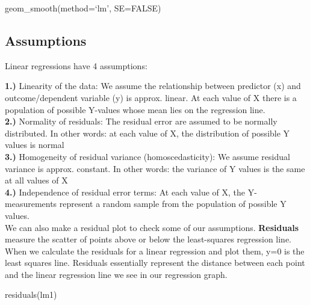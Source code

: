 \documentclass[
  letterpaper,
  DIV=11,
  numbers=noendperiod]{scrartcl}
\newenvironment{Shaded}{\begin{snugshade}}{\end{snugshade}}
\newcommand{\FunctionTok}[1]{\textcolor[rgb]{0.28,0.35,0.67}{#1}}
\newcommand{\NormalTok}[1]{\textcolor[rgb]{0.00,0.23,0.31}{#1}}
\begin{document}
geom\_smooth(method=`lm', SE=FALSE)

\subsection{\texorpdfstring{\textbf{Assumptions}}{Assumptions}}

Linear regressions have 4 assumptions:

\textbf{1.)} Linearity of the data: We assume the relationship between
predictor (x) and outcome/dependent variable (y) is approx. linear. At
each value of X there is a population of possible Y-values whose mean
lies on the regression line.\\

\textbf{2.)} Normality of residuals: The residual error are assumed to
be normally distributed. In other words: at each value of X, the
distribution of possible Y values is normal\\

\textbf{3.)} Homogeneity of residual variance (homoscedasticity): We
assume residual variance is approx. constant. In other words: the
variance of Y values is the same at all values of X\\
\textbf{4.)} Independence of residual error terms: At each value of X,
the Y-measurements represent a random sample from the population of
possible Y values.\\

We can also make a residual plot to check some of our assumptions.
\textbf{Residuals} measure the scatter of points above or below the
least-squares regression line. When we calculate the residuals for a
linear regression and plot them, y=0 is the least squares line.
Residuals essentially represent the distance between each point and the
linear regression line we see in our regression graph.

\begin{Shaded}
\begin{Highlighting}[]
\FunctionTok{residuals}\NormalTok{(lm1)}
\end{Highlighting}
\end{Shaded}
\end{document}
